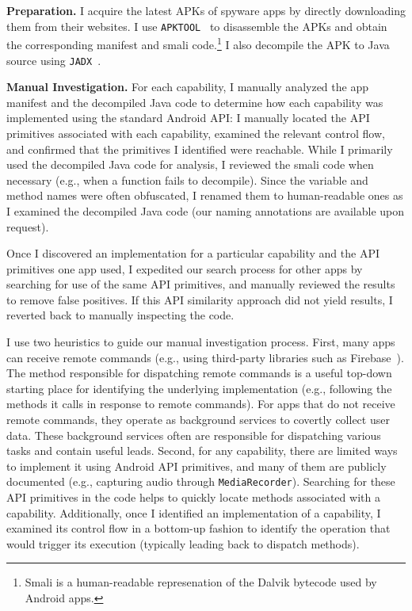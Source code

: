 \textbf{Preparation.} I acquire the latest APKs of spyware apps by directly downloading them from their websites. I use \texttt{APKTOOL}~\cite{ApktoolA72:online} to disassemble the APKs and obtain the corresponding manifest and smali code.\footnote{Smali is a human-readable represenation of the Dalvik bytecode used by Android apps.} I also decompile the APK to Java source using \texttt{JADX}~\cite{skylotja9:online}.

\textbf{Manual Investigation.}
For each capability, I manually analyzed the app manifest and the decompiled Java code to determine how
each capability was implemented using the standard Android API: I manually located the API primitives associated with each capability, examined the relevant control flow, and confirmed that the primitives I identified were reachable. While I primarily used the decompiled Java code for
analysis, I reviewed the smali code when necessary (e.g., when a function fails
to decompile). Since the variable and method names were often obfuscated, I renamed them to human-readable ones as I examined the decompiled Java code (our naming annotations are available upon request).

Once I discovered an implementation for a particular capability and
the API primitives one app used, I expedited our search process
for other apps by searching for use of the same API primitives, and manually
reviewed the results to remove false positives. If this API similarity
approach did not yield results, I reverted back to manually
inspecting the code.

I use two heuristics to guide our manual investigation process.
First, many apps can receive remote commands (e.g., using third-party
libraries such as Firebase~\cite{Firebase21:online}).  The method
responsible for dispatching remote commands is a useful top-down
starting place for identifying the underlying implementation (e.g.,
following the methods it calls in response to remote commands).  For
apps that do not receive remote commands, they operate as background
services to covertly collect user data. These background services
often are responsible for dispatching various tasks and contain useful
leads. Second, for any capability, there are limited ways to implement
it using Android API primitives, and many of them are publicly
documented (e.g., capturing audio through \texttt{MediaRecorder}). Searching for these API primitives in the code helps to
quickly locate methods associated with a capability. Additionally,
once I identified an implementation of a capability, I examined its
control flow in a bottom-up fashion to identify the operation that
would trigger its execution (typically leading back to dispatch
methods).


